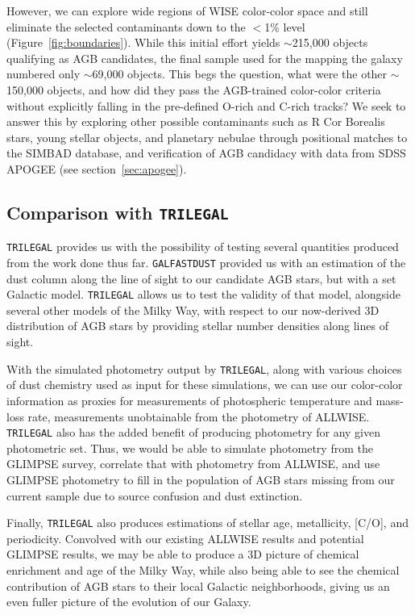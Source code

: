  However, we can explore wide regions of WISE color-color space and still eliminate the selected contaminants down to the $<$1\% level (Figure~\ref{fig:boundaries}). While this initial effort yields $\sim$215,000 objects qualifying as AGB candidates, the final sample used for the mapping the galaxy numbered only $\sim$69,000 objects. This begs the question, what were the other $\sim$150,000 objects, and how did they pass the AGB-trained color-color criteria without explicitly falling in the pre-defined O-rich and C-rich tracks? We seek to answer this by exploring other possible contaminants such as R Cor Borealis stars, young stellar objects, and planetary nebulae \citep{2002MNRAS.337..749J} through positional matches to the SIMBAD database, and verification of AGB candidacy with data from SDSS APOGEE (see section~\ref{sec:apogee}).

\subsection{Comparison with {\tt TRILEGAL}}
{\tt TRILEGAL} \citep{2005A&A...436..895G, 2007ASPC..378...20G} provides us with the possibility of testing several quantities produced from the work done thus far. {\tt GALFASTDUST} provided us with an estimation of the dust column along the line of sight to our candidate AGB stars, but with a set Galactic model. {\tt TRILEGAL}  allows us to test the validity of that model, alongside several other models of the Milky Way, with respect to our now-derived 3D distribution of AGB stars by providing stellar number densities along lines of sight.

With the simulated photometry output by {\tt TRILEGAL}, along with various choices of dust chemistry used as input for these simulations, we can use our color-color information as proxies for measurements of photospheric temperature and mass-loss rate, measurements unobtainable from the photometry of ALLWISE. {\tt TRILEGAL} also has the added benefit of producing photometry for any given photometric set. Thus, we would be able to simulate photometry from the GLIMPSE survey, correlate that with photometry from ALLWISE, and use GLIMPSE photometry to fill in the population of AGB stars missing from our current sample due to source confusion and dust extinction. 

Finally, {\tt TRILEGAL} also produces estimations of stellar age, metallicity, [C/O], and periodicity. Convolved with our existing ALLWISE results and potential GLIMPSE results, we may be able to produce a 3D picture of chemical enrichment and age of the Milky Way, while also being able to see the chemical contribution of AGB stars to their local Galactic neighborhoods, giving us an even fuller picture of the evolution of our Galaxy.

